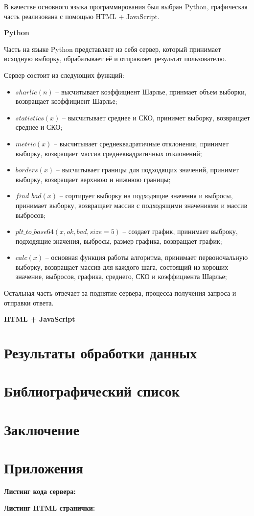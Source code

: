 \documentclass[a4paper,14pt]{article}
\begin{document}
В качестве основного языка программирования был выбран Python, графическая часть реализована с помощью HTML + JavaScript.

\textbf{Python}

Часть на языке Python представляет из себя сервер, который принимает исходную выборку, обрабатывает её и отправляет результат пользователю.

Сервер состоит из следующих функций:

\begin{itemize}
	\item $sharlie(n)$ -- высчитывает коэффициент Шарлье, принмает объем выборки, возвращает коэффициент Шарлье;
	
	\item $statistics(x)$ -- высчитывает среднее и СКО, принимет выборку, возвращает среднее и СКО;
	
	\item $metric(x)$ -- высчитывает среднеквадратичные отклонения, принимет выборку, возвращает массив среднеквадратичных отклонений;
	
	\item $borders(x)$ -- высчитывает границы для подходящих значений, принимет выборку, возвращает верхнюю и нижнюю границы;
	
	\item $find\_bad(x)$ -- сортирует выборку на подходящие значения и выбросы, принимает выборку, возвращает массив с подходящими значениями и массив выбросов;
	
	\item $plt\_to\_base64(x, ok, bad, size=5)$ -- создает график, принимает выброку, подходящие значения, выбросы, размер графика, возвращает график;
	
	\item $calc(x)$ -- основная функция работы алгоритма, принимает первоночальную выборку, возвращает массив для каждого шага, состоящий из хороших значение, выбросов, графика, среднего, СКО и коэффициента Шарлье;
	
\end{itemize}

	Остальная часть отвечает за поднятие сервера, процесса получения запроса и отправки ответа.
	
\textbf{HTML + JavaScript}


\section{Результаты обработки данных}

\section{Библиографический список}

\section{Заключение}

\section{Приложения}

\textbf{Листинг кода сервера:}

{\small }

\textbf{Листинг HTML странички:}

{\small }
\end{document}
